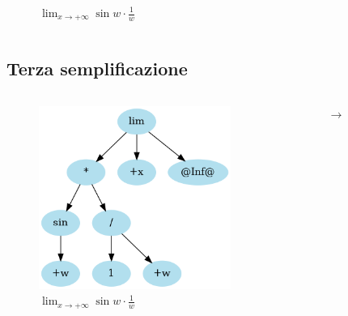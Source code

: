 \documentclass[aspectratio=149]{beamer}
\begin{document}
\begin{frame}
\begin{columns}
\begin{column}{0.45\textwidth}
\begin{figure}
					\caption{\(\lim_{x \to +\infty}{\sin{w} \cdot \frac{1}{w}}\)}
				\end{figure}
			\end{column}
		\end{columns}
	\end{frame}

	\subsection{Terza semplificazione}
	
	\begin{frame}
		\begin{columns}
			\begin{column}{0.45\textwidth}
				\begin{figure}
					\includegraphics[width=0.8\textwidth]{pres_img/rewritten.png}
					\caption{\(\lim_{x \to +\infty}{\sin{w} \cdot \frac{1}{w}}\)}
				\end{figure}
			\end{column}
			\begin{column}{0.1\textwidth}
				\begin{center}
					$\rightarrow$
				\end{center}
			\end{column}
			\begin{column}{0.45\textwidth}
				\begin{figure}

\end{figure}
\end{column}
\end{columns}
\end{frame}
\end{document}
